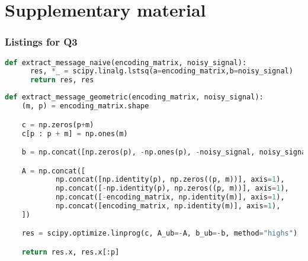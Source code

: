 \documentclass{article}
\begin{document}
\clearpage
\appendix

\part*{Supplementary material}
\section{Listings for Q3}


\begin{lstlisting}[language=Python, caption={Naive message decryption. The output is tuple of solution of the problem, and decrypted message itself}, label={lst:naive}]
    def extract_message_naive(encoding_matrix, noisy_signal):
      res, *_ = scipy.linalg.lstsq(a=encoding_matrix,b=noisy_signal)
      return res, res
  \end{lstlisting}




\begin{lstlisting}[language=Python, caption={Message decryption based on solution of LOP in geometric form. The output is tuple of solution of the problem, and decrypted message itself}, label={lst:geom}]
  def extract_message_geometric(encoding_matrix, noisy_signal):
    (m, p) = encoding_matrix.shape

    c = np.zeros(p+m)
    c[p : p + m] = np.ones(m)

    b = np.concat([np.zeros(p), -np.ones(p), -noisy_signal, noisy_signal])

    A = np.concat([
            np.concat([np.identity(p), np.zeros((p, m))], axis=1),
            np.concat([-np.identity(p), np.zeros((p, m))], axis=1),
            np.concat([-encoding_matrix, np.identity(m)], axis=1),
            np.concat([encoding_matrix, np.identity(m)], axis=1),
    ])

    res = scipy.optimize.linprog(c, A_ub=-A, b_ub=-b, method="highs")

    return res.x, res.x[:p]
\end{lstlisting}

\end{document}
